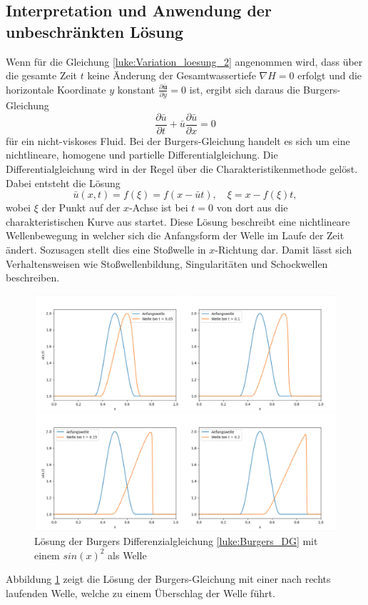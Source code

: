 \subsection{Interpretation und Anwendung der unbeschränkten Lösung}
Wenn für die Gleichung \eqref{luke:Variation_loesung_2} angenommen wird, dass über die gesamte Zeit $t$ keine Änderung der Gesamtwassertiefe $ \nabla H = 0 $ erfolgt und die horizontale Koordinate $y$ konstant $\frac{\partial \bar{\bm{u}}}{\partial y} = 0$ ist, ergibt sich daraus die Burgers-Gleichung
\begin{equation}
	\frac{\partial \bar{u}}{\partial t} + \bar{u} \frac{\partial \bar{u}}{\partial x} = 0
	\label{luke:Burgers_DG}
\end{equation}
für ein nicht-viskoses Fluid.
Bei der Burgers-Gleichung handelt es sich um eine nichtlineare, homogene und partielle Differentialgleichung.
Die Differentialgleichung wird in der Regel über die Charakteristikenmethode gelöst. 
Dabei entsteht die Lösung
\[
\bar{u}(x,t) = f(\xi) = f(x-\bar{u}t),\quad \xi = x-f(\xi)t,
\]
wobei $\xi$ der Punkt auf der $x$-Achse ist bei $t = 0$ von dort aus die charakteristischen Kurve aus startet.
Diese Lösung beschreibt eine nichtlineare Wellenbewegung in welcher sich die Anfangsform der Welle im Laufe der Zeit ändert.
Sozusagen stellt dies eine Stoßwelle in $x$-Richtung dar.
Damit lässt sich Verhaltensweisen wie Stoßwellenbildung, Singularitäten und Schockwellen beschreiben.
\begin{figure}
	\includegraphics[width=\textwidth]{papers/luke/fig/Burger_Loesung_Welle.jpg}
	\caption{Lösung der Burgers Differenzialgleichung \eqref{luke:Burgers_DG} mit einem $sin(x)^2$ als Welle
		\label{luke:fig:Loesung_Burgers}}
\end{figure}
Abbildung \ref{luke:fig:Loesung_Burgers} zeigt die Lösung der Burgers-Gleichung mit einer nach rechts laufenden Welle, welche zu einem Überschlag der Welle führt.

